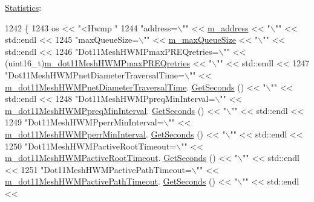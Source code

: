 \hyperlink{structns3_1_1dot11s_1_1HwmpProtocol_1_1Statistics}{Statistics}\+: 


\begin{DoxyCode}
1242 \{
1243   os << \textcolor{stringliteral}{"<Hwmp "}
1244   \textcolor{stringliteral}{"address=\(\backslash\)""} << \hyperlink{classns3_1_1dot11s_1_1HwmpProtocol_abe24aa7305ec320810e4a0343ca9b25a}{m\_address} << \textcolor{stringliteral}{"\(\backslash\)""} << std::endl <<
1245   \textcolor{stringliteral}{"maxQueueSize=\(\backslash\)""} << \hyperlink{classns3_1_1dot11s_1_1HwmpProtocol_ae9573ffc51b306002cc6a7c13132b995}{m\_maxQueueSize} << \textcolor{stringliteral}{"\(\backslash\)""} << std::endl <<
1246   \textcolor{stringliteral}{"Dot11MeshHWMPmaxPREQretries=\(\backslash\)""} << (uint16\_t)\hyperlink{classns3_1_1dot11s_1_1HwmpProtocol_afb618f3a22ef3fff0e664fac76040933}{m\_dot11MeshHWMPmaxPREQretries} 
      << \textcolor{stringliteral}{"\(\backslash\)""} << std::endl <<
1247   \textcolor{stringliteral}{"Dot11MeshHWMPnetDiameterTraversalTime=\(\backslash\)""} << 
      \hyperlink{classns3_1_1dot11s_1_1HwmpProtocol_a3f26703a06f87191bec8a9ad3506ca36}{m\_dot11MeshHWMPnetDiameterTraversalTime}.
      \hyperlink{classns3_1_1Time_a8f20d5c3b0902d7b4320982f340b57c8}{GetSeconds} () << \textcolor{stringliteral}{"\(\backslash\)""} << std::endl <<
1248   \textcolor{stringliteral}{"Dot11MeshHWMPpreqMinInterval=\(\backslash\)""} << \hyperlink{classns3_1_1dot11s_1_1HwmpProtocol_ac51f536a9d3735b2e07440a1c2768a5f}{m\_dot11MeshHWMPpreqMinInterval}.
      \hyperlink{classns3_1_1Time_a8f20d5c3b0902d7b4320982f340b57c8}{GetSeconds} () << \textcolor{stringliteral}{"\(\backslash\)""} << std::endl <<
1249   \textcolor{stringliteral}{"Dot11MeshHWMPperrMinInterval=\(\backslash\)""} << \hyperlink{classns3_1_1dot11s_1_1HwmpProtocol_a89cb14f3f69474e5c6e39bc40bfbc839}{m\_dot11MeshHWMPperrMinInterval}.
      \hyperlink{classns3_1_1Time_a8f20d5c3b0902d7b4320982f340b57c8}{GetSeconds} () << \textcolor{stringliteral}{"\(\backslash\)""} << std::endl <<
1250   \textcolor{stringliteral}{"Dot11MeshHWMPactiveRootTimeout=\(\backslash\)""} << \hyperlink{classns3_1_1dot11s_1_1HwmpProtocol_ac00e9fdbf81e8597acc90b02ba3455a9}{m\_dot11MeshHWMPactiveRootTimeout}.
      \hyperlink{classns3_1_1Time_a8f20d5c3b0902d7b4320982f340b57c8}{GetSeconds} () << \textcolor{stringliteral}{"\(\backslash\)""} << std::endl <<
1251   \textcolor{stringliteral}{"Dot11MeshHWMPactivePathTimeout=\(\backslash\)""} << \hyperlink{classns3_1_1dot11s_1_1HwmpProtocol_a435cff65c1ec1b398186c246ea02f695}{m\_dot11MeshHWMPactivePathTimeout}.
      \hyperlink{classns3_1_1Time_a8f20d5c3b0902d7b4320982f340b57c8}{GetSeconds} () << \textcolor{stringliteral}{"\(\backslash\)""} << std::endl <<

\end{DoxyCode}
